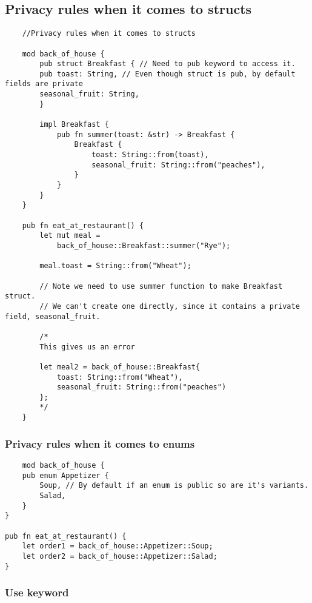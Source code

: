 \subsection{Privacy rules when it comes to structs}

\begin{lstlisting}
    //Privacy rules when it comes to structs

    mod back_of_house {
        pub struct Breakfast { // Need to pub keyword to access it.
        pub toast: String, // Even though struct is pub, by default fields are private 
        seasonal_fruit: String,
        }

        impl Breakfast {
            pub fn summer(toast: &str) -> Breakfast {
                Breakfast {
                    toast: String::from(toast),
                    seasonal_fruit: String::from("peaches"),
                }
            }
        }
    }

    pub fn eat_at_restaurant() {
        let mut meal = 
            back_of_house::Breakfast::summer("Rye");
        
        meal.toast = String::from("Wheat");
        
        // Note we need to use summer function to make Breakfast struct.
        // We can't create one directly, since it contains a private field, seasonal_fruit.

        /*
        This gives us an error 
        
        let meal2 = back_of_house::Breakfast{
            toast: String::from("Wheat"),
            seasonal_fruit: String::from("peaches")
        };
        */
    }
\end{lstlisting}

\newpage
\subsubsection{Privacy rules when it comes to enums}

\begin{lstlisting}
    mod back_of_house {
    pub enum Appetizer { 
        Soup, // By default if an enum is public so are it's variants.
        Salad,
    }
}

pub fn eat_at_restaurant() {
    let order1 = back_of_house::Appetizer::Soup;
    let order2 = back_of_house::Appetizer::Salad;
}
\end{lstlisting}

\newpage
\subsubsection{Use keyword}
